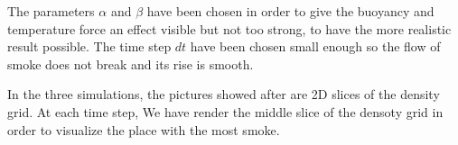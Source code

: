 \documentclass[accepted,single]{gipaper}
\begin{document}
The parameters $\alpha$ and $\beta$ have been chosen in order to give the buoyancy and temperature force an effect visible but not too strong, to have the more realistic result possible. The time step $dt$ have been chosen small enough so the flow of smoke does not break and its rise is smooth.

In the three simulations, the pictures showed after are 2D slices of the density grid. At each time step, We have render the middle slice of the densoty grid in order to visualize the place with the most smoke.
\end{document}
